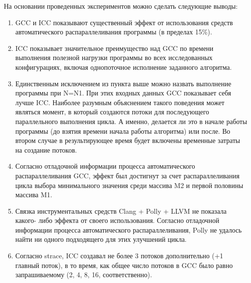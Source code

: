 \documentclass[a4paper,14pt,russian]{extarticle}
\begin{document}
На основании проведенных экспериментов можно сделать следующие выводы:
\begin{enumerate}
	\item GCC и ICC показывают существенный эффект от использования средств автоматического распараллеливания программы (в пределах 15\%).
	\item ICC показывает значительное преимущество над GCC по времени выполнения полезной нагрузки программы во всех исследованных конфигурациях, включая однопоточное исполнение заданного алгоритма.
	\item Единственным исключением из пункта выше можно назвать выполнение программы при N=N1. При этих входных данных GCC показывает себя лучше ICC. Наиболее разумным объяснением такого поведения может являться момент, в который создаются потоки для последующего параллельного выполнения цикла. А именно, делается ли это в начале работы программы (до взятия времени начала работы алгоритма) или после. Во втором случае в результирующее время будет включены временные затраты на создание потоков.
	\item Согласно отладочной информации процесса автоматического распараллеливания GCC, эффект был достигнут за счет распараллеливания цикла выбора минимального значения среди массива M2 и первой половины массива M1.
	\item Связка инструментальных средств Clang + Polly + LLVM не показала какого- либо эффекта от своего использования. Согласно отладочной информации процесса автоматического распараллеливания, Polly не удалось найти ни одного подходящего для этих улучшений цикла.
	\item Согласно strace, ICC создавал не более 3 потоков дополнительно (+1 главный поток), в то время, как общее число потоков в GCC было равно запрашиваемому (2, 4, 8, 16, соответственно).
\end{enumerate}
\end{document}
